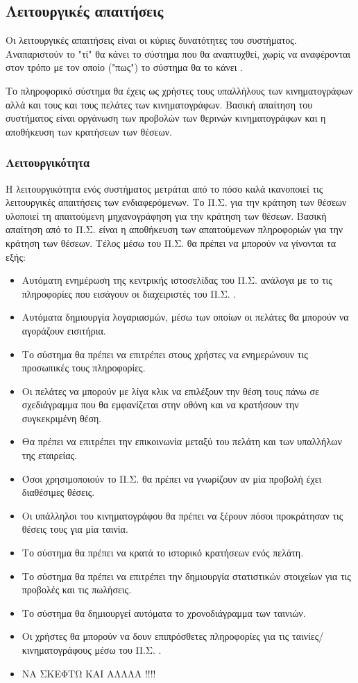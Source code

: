 \documentclass{assignment}
\begin{document}
\subsection{Λειτουργικές απαιτήσεις}

Οι λειτουργικές απαιτήσεις είναι οι κύριες δυνατότητες του συστήματος. Αναπαριστούν το "τί" θα κάνει το σύστημα που θα αναπτυχθεί, χωρίς να αναφέρονται στον τρόπο με τον οποίο ("πως") το σύστημα θα το κάνει \cite{triadis}.

Το πληροφορικό σύστημα θα έχεις ως χρήστες τους υπαλλήλους των κινηματογράφων αλλά και τους και τους πελάτες των κινηματογράφων. Βασική απαίτηση του συστήματος είναι οργάνωση των προβολών των θερινών κινηματογράφων και η αποθήκευση των κρατήσεων των θέσεων.

\subsubsection{Λειτουργικότητα}
Η λειτουργικότητα ενός συστήματος μετράται από το πόσο καλά ικανοποιεί τις λειτουργικές απαιτήσεις των ενδιαφερόμενων. Το Π.Σ. για την κράτηση των θέσεων υλοποιεί τη απαιτούμενη μηχανογράφηση για την κράτηση των θέσεων. Βασική απαίτηση από το Π.Σ. είναι η αποθήκευση των απαιτούμενων πληροφοριών για την κράτηση των θέσεων. Τέλος μέσω του Π.Σ. θα πρέπει να μπορούν να γίνονται τα εξής:

\begin{itemize}
\item Αυτόματη ενημέρωση της κεντρικής ιστοσελίδας του Π.Σ. ανάλογα με το τις πληροφορίες που εισάγουν οι διαχειριστές του Π.Σ. .
\item Αυτόματα δημιουργία λογαριασμών, μέσω των οποίων οι πελάτες θα μπορούν να αγοράζουν εισιτήρια.
\item Το σύστημα θα πρέπει να επιτρέπει στους χρήστες να ενημερώνουν τις προσωπικές τους πληροφορίες.
\item Οι πελάτες να μπορούν με λίγα κλικ να επιλέξουν την θέση τους πάνω σε σχεδιάγραμμα που θα εμφανίζεται στην οθόνη και να κρατήσουν την συγκεκριμένη θέση.
\item Θα πρέπει να επιτρέπει την επικοινωνία μεταξύ του πελάτη και των υπαλλήλων της εταιρείας. 
\item Όσοι χρησιμοποιούν το Π.Σ. θα πρέπει να γνωρίζουν αν μία προβολή έχει διαθέσιμες θέσεις.
\item Οι υπάλληλοι του κινηματογράφου θα πρέπει να ξέρουν πόσοι προκράτησαν τις θέσεις τους για μία ταινία.
\item Το σύστημα θα πρέπει να κρατά το ιστορικό κρατήσεων ενός πελάτη.
\item Το σύστημα θα πρέπει να επιτρέπει την δημιουργία στατιστικών στοιχείων για τις προβολές και τις πωλήσεις.
\item Το σύστημα θα δημιουργεί αυτόματα το χρονοδιάγραμμα των ταινιών.
\item Οι χρήστες θα μπορούν να δουν επιπρόσθετες πληροφορίες για τις ταινίες/κινηματογράφους μέσω του Π.Σ. .
\item ΝΑ ΣΚΕΦΤΩ ΚΑΙ ΑΛΛΛΑ !!!!
\end{itemize}
\end{document}
